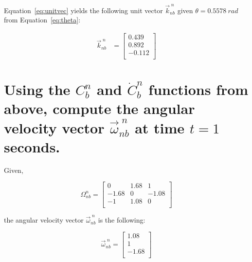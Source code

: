 \begin{parts}
\begin{subparts}
        \solution
        Equation~\ref{eq:unitvec} yields the following unit vector $\vec{k}^{\;n}_{nb}$ given $\theta = 0.5578~\unit{rad}$ from Equation~\ref{eq:theta}:

        \begin{equation*}
            \begin{split}
                \vec{k}^{\;n}_{nb} & =
                \begin{bmatrix}
                    0.439  \\
                    0.892  \\
                    -0.112 \\
                \end{bmatrix}
            \end{split}
        \end{equation*}

    \end{subparts}

    \part{Using the $C^n_b$ and $\dot{C}^n_b$ functions from above, compute the angular velocity vector $\vec{\omega}^{\;n}_{nb}$ at time $t = 1$ seconds.}

    \begin{subparts}

        \solution
        Given,

        \[\Omega^{n}_{nb} =
            \begin{bmatrix}
                0     & 1.68 & 1     \\
                -1.68 & 0    & -1.08 \\
                -1    & 1.08 & 0     \\
            \end{bmatrix}\]

        the angular velocity vector $\vec{\omega}^{\;n}_{nb}$ is the following:

        \[\vec{\omega}^{\;n}_{nb}=
            \begin{bmatrix}
                1.08  \\
                1     \\
                -1.68 \\
            \end{bmatrix}\]


\end{subparts}
\end{parts}
